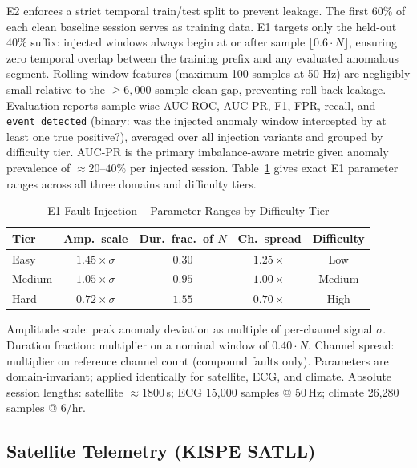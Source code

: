 \documentclass[conference]{IEEEtran}
\begin{document}
E2 enforces a strict temporal train/test split to prevent leakage. The first 60\% of each clean baseline session serves as training data. E1 targets only the held-out 40\% suffix: injected windows always begin at or after sample $\lfloor 0.6 \cdot N \rfloor$, ensuring zero temporal overlap between the training prefix and any evaluated anomalous segment. Rolling-window features (maximum 100 samples at 50 Hz) are negligibly small relative to the $\geq\!6{,}000$-sample clean gap, preventing roll-back leakage. Evaluation reports sample-wise AUC-ROC, AUC-PR, F1, FPR, recall, and \texttt{event\_detected} (binary: was the injected anomaly window intercepted by at least one true positive?), averaged over all injection variants and grouped by difficulty tier. AUC-PR is the primary imbalance-aware metric given anomaly prevalence of $\approx\!20$--$40\%$ per injected session. Table~\ref{tab:m4params} gives exact E1 parameter ranges across all three domains and difficulty tiers.

\begin{table}[t]
\caption{E1 Fault Injection -- Parameter Ranges by Difficulty Tier}
\label{tab:m4params}
\centering
\scriptsize
\setlength{\tabcolsep}{3pt}
\begin{tabular}{@{}lcccc@{}}
\toprule
\textbf{Tier} & \textbf{Amp.\ scale} & \textbf{Dur.\ frac.\ of $N$} & \textbf{Ch.\ spread} & \textbf{Difficulty} \\
\midrule
Easy   & $1.45\times\sigma$ & $0.30$ & $1.25\times$ & Low \\
Medium & $1.05\times\sigma$ & $0.95$ & $1.00\times$ & Medium \\
Hard   & $0.72\times\sigma$ & $1.55$ & $0.70\times$ & High \\
\bottomrule
\end{tabular}
{\vspace{2pt}\scriptsize Amplitude scale: peak anomaly deviation as multiple of per-channel signal $\sigma$. Duration fraction: multiplier on a nominal window of $0.40 \cdot N$. Channel spread: multiplier on reference channel count (compound faults only). Parameters are domain-invariant; applied identically for satellite, ECG, and climate. Absolute session lengths: satellite $\approx\!1800$\,s; ECG 15,000 samples @ 50\,Hz; climate 26,280 samples @ 6/hr.}
\end{table}

\subsection{Satellite Telemetry (KISPE SATLL)}
\end{document}
